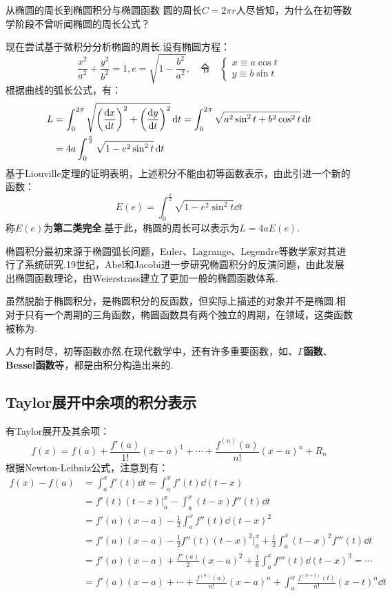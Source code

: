 \begin{extension}{从椭圆的周长到椭圆积分与椭圆函数}
    圆的周长$C = 2\pi r$人尽皆知，为什么在初等数学阶段不曾听闻椭圆的周长公式？

    现在尝试基于微积分分析椭圆的周长.设有椭圆方程：
    \[\frac{x^2}{a^2} + \frac{y^2}{b^2} = 1, e = \sqrt{1-\frac{b^2}{a^2}},\quad\text{令}\quad\begin{cases}
        x \equiv a \cos t\\
        y \equiv b \sin t
    \end{cases}\]
    根据曲线的弧长公式，有：
    \begin{align*}
        L &= \int_{0}^{2\pi}\sqrt{\left(\dv{x}{t}\right)^2 + \left(\dv{y}{t}\right)^2}\dd{t} = \int_{0}^{2\pi}\sqrt{a^2\sin^2 t + b^2\cos^2 t}\dd{t}\\
        &= 4a \int_{0}^{\frac{\pi}{2}}\sqrt{1-e^2\sin^2 t}\dd{t}
    \end{align*}
    基于Liouville定理的证明表明，上述积分不能由初等函数表示，由此引进一个新的函数：
    \[E(e) = \int_{0}^{\frac{\pi}{2}}\sqrt{1-e^2\sin^2t}\dd{t}\]
    称$E(e)$为\textbf{第二类完全}\!\!.基于此，椭圆的周长可以表示为$L=4aE(e)$.

    椭圆积分最初来源于椭圆弧长问题，Euler、Lagrange、Legendre等数学家对其进行了系统研究.19世纪，Abel和Jacobi进一步研究椭圆积分的反演问题，由此发展出椭圆函数理论，由Weierstrass建立了更加一般的椭圆函数体系.

    虽然脱胎于椭圆积分，是椭圆积分的反函数，但实际上描述的对象并不是椭圆.相对于只有一个周期的三角函数，椭圆函数具有两个独立的周期，在领域，这类函数被称为.

    人力有时尽，初等函数亦然.在现代数学中，还有许多重要函数，如、\textbf{$\Gamma$函数}、\textbf{Bessel函数}等，都是由积分构造出来的.
\end{extension}


\subsection{Taylor展开中余项的积分表示}
有Taylor展开及其余项：
\[f(x) = f(a) + \frac{f'(a)}{1!}(x-a)^1 + \cdots + \frac{f^{(n)}(a)}{n!}(x-a)^n + R_n\]
根据Newton-Leibniz公式，注意到有：
\begin{align*}
    f(x) - f(a) &= \int_{a}^{x}f'(t)\dd{t} = \int_{a}^{x}f'(t)\dd{(t-x)}\\
    &= f'(t)(t-x)\Big|_a^x - \int_{a}^{x}(t-x)f''(t)\dd{t}\\
    &= f'(a)(x-a) - \frac{1}{2}\int_{a}^{x}f''(t)\dd{(t-x)^2}\\
    &= f'(a)(x-a) - \frac{1}{2}f''(t)(t-x)^2\Big|_a^x + \frac{1}{2}\int_{a}^{x}(t-x)^2 f'''(t)\dd{t}\\
    &= f'(a)(x-a) + \frac{f''(a)}{2}(x-a)^2 + \frac{1}{6}\int_{a}^{x}f'''(t)\dd{(t-x)^3} = \cdots\\
    &= f'(a)(x-a) + \cdots + \frac{f^{(n)}(a)}{n!}(x-a)^n + \int_{a}^{x}\frac{f^{(n+1)}(t)}{n!}(x-t)^n \dd{t}
\end{align*}

